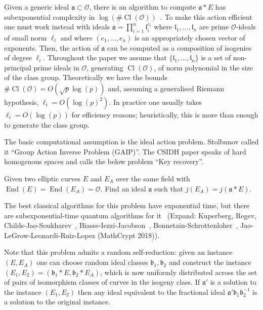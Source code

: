 \documentclass{llncs}
\newcommand{\OO}{\mathcal{O}}
\DeclareMathOperator{\End}{End}
\DeclareMathOperator{\Cl}{Cl}
\renewcommand{\a}{\mathfrak{a}}
\renewcommand{\b}{\mathfrak{b}}
\renewcommand{\l}{\mathfrak{l}}
\begin{document}
Given a generic ideal $\a\subset\OO$, there is an algorithm to compute $\a*E$ has subexponential complexity in $\log(\#\Cl(\OO))$~\cite{JS10,biasse_fieker_jacobson_2016}.
To make this action efficient one must work instead with ideals $\a = \prod_{i=1}^n \l_i^{e_i}$ where $\l_1, \dots, \l_n$ are prime $\OO$-ideals of small norm $\ell_i$ and where $(e_1, \dots, e_n)$ is an appropriately chosen vector of exponents.
Then, the action of $\a$ can be computed as a composition of isogenies of degree $\ell_i$.
Throughout the paper we assume that $\{ \l_1, \dots, \l_n \}$ is a set of non-principal prime ideals in $\OO$, generating $\Cl(\OO)$, of norm polynomial in the size of the class group.
Theoretically we have the bounds $\#\Cl(\OO) = O( \sqrt{p} \log(p) )$ and, assuming a generalised Riemann hypothesis, $\ell_i = O( \log(p)^2 )$.
In practice one usually takes $\ell_i=O(\log(p))$ for efficiency reasons; heuristically, this is more than enough to generate the class group.

The basic computational assumption is the ideal action problem.
Stolbunov called it ``Group Action Inverse Problem (GAIP)''.
The CSIDH paper speaks of hard homogenous spaces and calls the below problem ``Key recovery''.

\begin{definition}\label{defn:ass1}
Given two elliptic curves $E$ and $E_A$ over the same field with $\End(E) = \End(E_A) = \OO$. Find an ideal $\a$ such that $j( E_A ) = j( \a * E )$.
\end{definition}

The best classical algorithms for this problem have exponential time, but there are subexponential-time quantum algorithms for it~\cite{Kup,regev04,childs2014constructing,Kuperberg2013,BS18,BIJ18}
(Expand: Kuperberg, Regev, Childs-Jao-Soukharev~\cite{childs2014constructing}, Biasse-Iezzi-Jacobson~\cite{BIJ18}, Bonnetain-Schrottenloher~\cite{BS18}, Jao-LeGrow-Leonardi-Ruiz-Lopez (MathCrypt 2018)).

Note that this problem admits a random self-reduction: given an instance $(E, E_A)$ one can choose random ideal classes $\b_1, \b_2$ and construct the instance $(E_1, E_2) = (\b_1 * E, \b_2 * E_A )$, which is now uniformly distributed across the set of pairs of isomorphism classes of curves in the isogeny class.
If $\a'$ is a solution to the instance $(E_1, E_2)$ then any ideal equivalent to the fractional ideal $\a'\b_1 \b_2^{-1}$ is a solution to the original instance.
\end{document}
